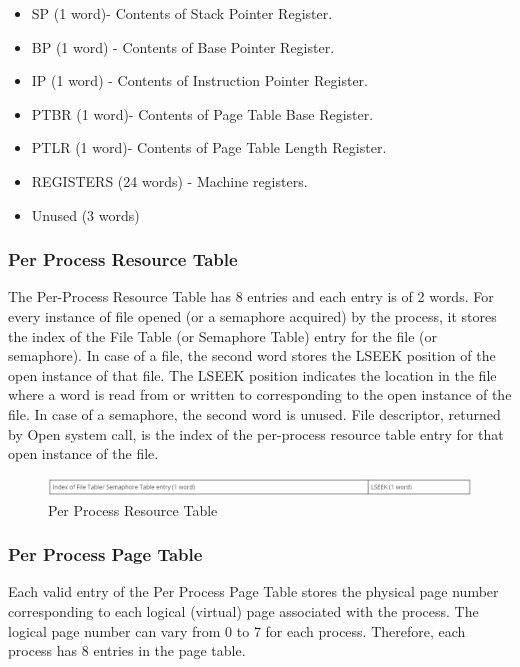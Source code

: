 \begin {itemize}
\item SP (1 word)- Contents of Stack Pointer Register.
\item BP (1 word) - Contents of Base Pointer Register.
\item IP (1 word) - Contents of Instruction Pointer Register.
\item PTBR (1 word)- Contents of Page Table Base Register.
\item PTLR (1 word)- Contents of Page Table Length Register.
\item REGISTERS (24 words) - Machine registers.
\item Unused (3 words)
\end {itemize}

\subsubsection {Per Process Resource Table}

The Per-Process Resource Table has 8 entries and each entry is of 2 words. For every instance of file opened (or a semaphore acquired) by the process, it stores the index of the File Table (or Semaphore Table) entry for the file (or semaphore). In case of a file, the second word stores the LSEEK position of the open instance of that file. The LSEEK position indicates the location in the file where a word is read from or written to corresponding to the open instance of the file. In case of a semaphore, the second word is unused. File descriptor, returned by Open system call, is the index of the per-process resource table entry for that open instance of the file.
\begin{figure}[ht]
\centering
\includegraphics  [scale=0.55]{figures/prt.png}
\caption{\footnotesize Per Process Resource Table}
\end{figure}


\subsubsection {Per Process Page Table}
Each valid entry of the Per Process Page Table stores the physical page number corresponding to each logical (virtual) page associated with the process. The logical page number can vary from 0 to 7 for each process. Therefore, each process has 8 entries in the page table. 

